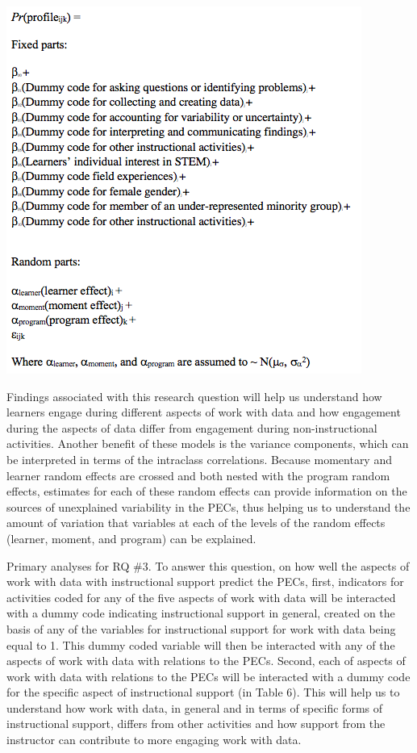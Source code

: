 \documentclass[]{book}
\theoremstyle{definition}
\theoremstyle{definition}
\theoremstyle{definition}
\theoremstyle{remark}
\begin{document}
\begin{center}\includegraphics[width=0.8\linewidth]{images/model-figure} \end{center}

Findings associated with this research question will help us understand
how learners engage during different aspects of work with data and how
engagement during the aspects of data differ from engagement during
non-instructional activities. Another benefit of these models is the
variance components, which can be interpreted in terms of the intraclass
correlations. Because momentary and learner random effects are crossed
and both nested with the program random effects, estimates for each of
these random effects can provide information on the sources of
unexplained variability in the PECs, thus helping us to understand the
amount of variation that variables at each of the levels of the random
effects (learner, moment, and program) can be explained.

Primary analyses for RQ \#3. To answer this question, on how well the
aspects of work with data with instructional support predict the PECs,
first, indicators for activities coded for any of the five aspects of
work with data will be interacted with a dummy code indicating
instructional support in general, created on the basis of any of the
variables for instructional support for work with data being equal to 1.
This dummy coded variable will then be interacted with any of the
aspects of work with data with relations to the PECs. Second, each of
aspects of work with data with relations to the PECs will be interacted
with a dummy code for the specific aspect of instructional support (in
Table 6). This will help us to understand how work with data, in general
and in terms of specific forms of instructional support, differs from
other activities and how support from the instructor can contribute to
more engaging work with data.
\end{document}
